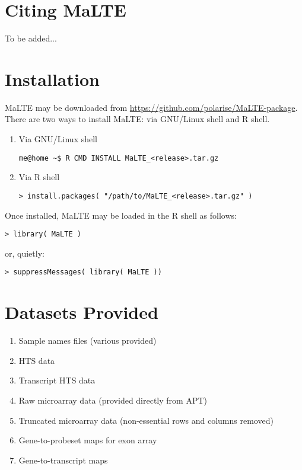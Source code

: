 \documentclass[a4paper,12pt]{article}
\begin{document}
\section{Citing \textsf{MaLTE}}
To be added...


\section{Installation}
\label{installation}
\textsf{MaLTE} may be downloaded from \url{https://github.com/polarise/MaLTE-package}. There are two ways to install \textsf{MaLTE}: via GNU/Linux shell and \textsf{R} shell.

\begin{enumerate}
\item Via GNU/Linux shell
\begin{verbatim}
me@home ~$ R CMD INSTALL MaLTE_<release>.tar.gz
\end{verbatim}

\item Via \textsf{R} shell
\begin{verbatim}
> install.packages( "/path/to/MaLTE_<release>.tar.gz" )
\end{verbatim}
\end{enumerate}

Once installed, \textsf{MaLTE} may be loaded in the \textsf{R} shell as follows:
\begin{verbatim}
> library( MaLTE )
\end{verbatim}

or, quietly:

\begin{verbatim}
> suppressMessages( library( MaLTE ))
\end{verbatim}

\section{Datasets Provided}
\label{datasets}
\begin{enumerate}
\item Sample names files (various provided)
\item HTS data
\item Transcript HTS data
\item Raw microarray data (provided directly from APT)
\item Truncated microarray data (non-essential rows and columns removed)
\item Gene-to-probeset maps for exon array
\item Gene-to-transcript maps
\end{enumerate}
\end{document}
